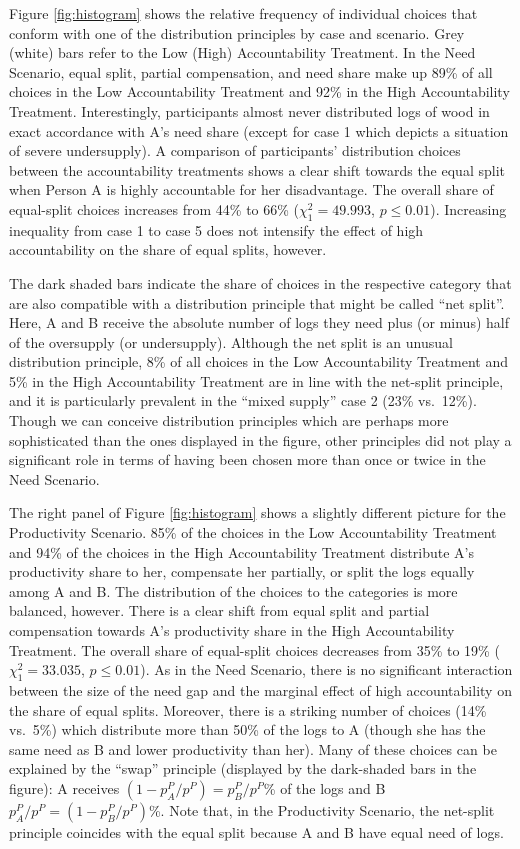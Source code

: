\documentclass[smallcondensed]{svjour3}
\begin{document}
%
Figure \ref{fig:histogram} shows the relative frequency of individual choices that conform with one of the distribution principles by case and scenario. Grey (white) bars refer to the Low (High) Accountability Treatment. In the Need Scenario, equal split, partial compensation, and need share make up 89\% of all choices in the Low Accountability Treatment and 92\% in the High Accountability Treatment. Interestingly, participants almost never distributed logs of wood in exact accordance with A's need share (except for case 1 which depicts a situation of severe undersupply). A comparison of participants' distribution choices between the accountability treatments shows a clear shift towards the equal split when Person A is highly accountable for her disadvantage. The overall share of equal-split choices increases from 44\% to 66\% ($\chi^2_1=49.993$, $p\le0.01$). Increasing inequality from case 1 to case 5 does not intensify the effect of high accountability on the share of equal splits, however.\par
%
The dark shaded bars indicate the share of choices in the respective category that are also compatible with a distribution principle that might be called ``net split''. Here, A and B receive the absolute number of logs they need plus (or minus) half of the oversupply (or undersupply). Although the net split is an unusual distribution principle, 8\% of all choices in the Low Accountability Treatment and 5\% in the High Accountability Treatment are in line with the net-split principle, and it is particularly prevalent in the ``mixed supply'' case 2 (23\% vs.~12\%). Though we can conceive distribution principles which are perhaps more sophisticated than the ones displayed in the figure, other principles did not play a significant role in terms of having been chosen more than once or twice in the Need Scenario.\par
%
The right panel of Figure \ref{fig:histogram} shows a slightly different picture for the Productivity Scenario. 85\% of the choices in the Low Accountability Treatment and 94\% of the choices in the High Accountability Treatment distribute A's productivity share to her, compensate her partially, or split the logs equally among A and B. The distribution of the choices to the categories is more balanced, however. There is a clear shift from equal split and partial compensation towards A's productivity share in the High Accountability Treatment. The overall share of equal-split choices decreases from 35\% to 19\% ($\chi^2_1=33.035$, $p\le0.01$). As in the Need Scenario, there is no significant interaction between the size of the need gap and the marginal effect of high accountability on the share of equal splits. Moreover, there is a striking number of choices (14\% vs.~5\%) which distribute more than 50\% of the logs to A (though she has the same need as B and lower productivity than her). Many of these choices can be explained by the ``swap'' principle (displayed by the dark-shaded bars in the figure): A receives $(1-p_A^P/p^P)=p_B^P/p^P$\% of the logs and B $p_A^P/p^P=(1-p_B^P/p^P)$\%. Note that, in the Productivity Scenario, the net-split principle coincides with the equal split because A and B have equal need of logs.\par
\end{document}
